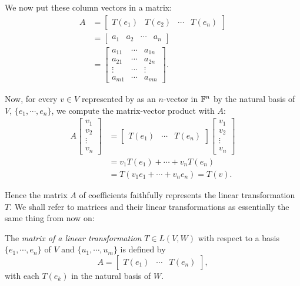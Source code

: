 We now put these column vectors in a matrix:
\begin{align*}
  A &= \begin{bmatrix}
    T(e_1) & T(e_2) & \cdots & T(e_n)
  \end{bmatrix}\\
  &= \begin{bmatrix}
    a_1 & a_2 & \cdots & a_n
  \end{bmatrix}\\
  &= \begin{bmatrix}
    a_{11} & \cdots & a_{1n}\\
    a_{21} & \cdots & a_{2n}\\
    \vdots & \cdots & \vdots\\
    a_{m1} & \cdots & a_{mn}
  \end{bmatrix}.
\end{align*}

Now, for every $v\in V$ represented by as an $n$-vector in $\mathbb{F}^n$ by the natural basis of $V$, $\{e_1, \cdots, e_n\}$, we compute the matrix-vector product with $A$:
\begin{align*}
  A\begin{bmatrix}
    v_1 \\ v_2 \\ \vdots \\ v_n
  \end{bmatrix} &= \begin{bmatrix}
    T(e_1) & \cdots & T(e_n)
  \end{bmatrix} \begin{bmatrix}
    v_1 \\ v_2 \\ \vdots \\ v_n
  \end{bmatrix}\\
  &= v_1 T(e_1) + \cdots + v_n T(e_n)\\
  &= T(v_1 e_1 + \cdots + v_n e_n) =T(v).
\end{align*}

Hence the matrix $A$ of coefficients faithfully represents the linear transformation $T$. We shall refer to matrices and their linear transformations as essentially the same thing from now on:

\begin{definition}
  The \emph{matrix of a linear transformation} $T\in L(V,W)$ with respect to a basis $\{e_1,\cdots,e_n\}$ of $V$ and $\{u_1,\cdots,u_m\}$ is defined by
  \[
    A = \begin{bmatrix}
      T(e_1) & \cdots & T(e_n)
    \end{bmatrix},
  \]
  with each $T(e_k)$ in the natural basis of $W$.
\end{definition}

